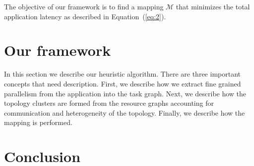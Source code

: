 \documentclass[10pt, conference, compsocconf]{IEEEtran}
\begin{document}
The objective of our framework is to find a mapping $\mathcal{M}$
that minimizes the total application latency as described in
Equation~(\ref{eq:2}).


\section{Our framework}
\label{sec:our-framework}

In this section we describe our heuristic algorithm. There are three
important concepts that need description. First, we describe how we
extract fine grained parallelism from the application into the task
graph. Next, we describe how the topology clusters are formed from the
resource graphs accounting for communication and heterogeneity of the
topology. Finally, we describe how the mapping is performed.











\section{Conclusion}
\label{sec:conclusion}
\end{document}
